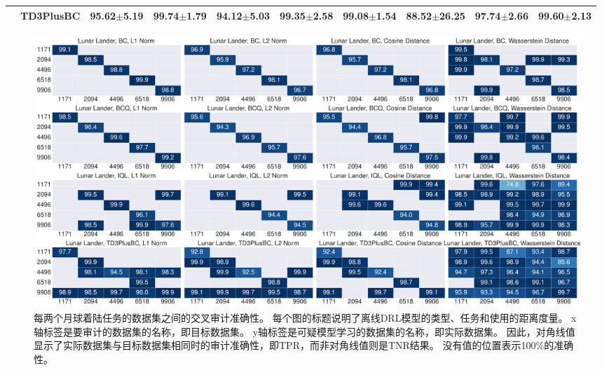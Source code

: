\begin{table}[!ht]
\begin{tabular}{cccccccccc}
                                                                                           & TD3PlusBC                                                                                  & 95.62$\pm$5.19          & 99.74$\pm$1.79           & 94.12$\pm$5.03          & 99.35$\pm$2.58          & 99.08$\pm$1.54          & 88.52$\pm$26.25                                                       & \textbf{97.74$\pm$2.66} & \textbf{99.60$\pm$2.13}                                                     \\
    \bottomrule
    \end{tabular}
\end{table}

\begin{figure}[!ht]
    \includegraphics[width=\hsize]{figure/orl_auditor/overall_sac_lunarlander_20230130181510409.pdf}
    \caption{
    每两个月球着陆任务的数据集之间的交叉审计准确性。
    每个图的标题说明了离线DRL模型的类型、任务和使用的距离度量。
    x轴标签是要审计的数据集的名称，即目标数据集。
    y轴标签是可疑模型学习的数据集的名称，即实际数据集。
    因此，对角线值显示了实际数据集与目标数据集相同时的审计准确性，即TPR，而非对角线值则是TNR结果。
    没有值的位置表示100\%的准确性。
    }
    \label{fig:audit result on lunarlander}
\end{figure}
    
